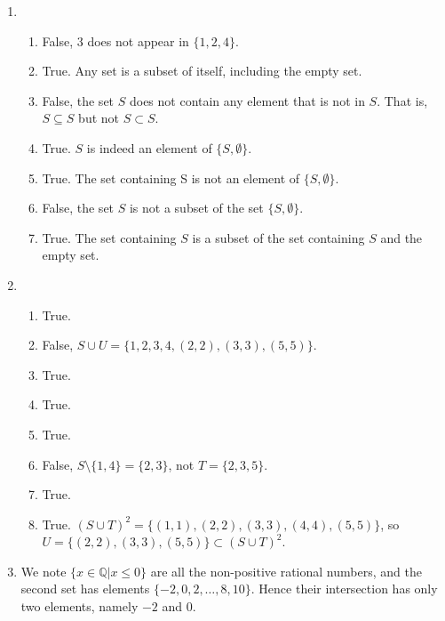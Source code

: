 \begin{enumerate}
    \item \begin{enumerate}[label=(\alph*)]
        \item False, 3 does not appear in $\{1, 2, 4\}$.
        \item True. Any set is a subset of itself, including the empty set.
        \item False, the set $S$ does not contain any element that is not in $S$. That is, $S \subseteq S$ but not $S \subset S$.
        \item True. $S$ is indeed an element of $\{S, \emptyset\}$.
        \item True. The set containing S is not an element of $\{S, \emptyset\}$.
        \item False, the set $S$ is not a subset of the set $\{S, \emptyset\}$.
        \item True. The set containing $S$ is a subset of the set containing $S$ and the empty set.
    \end{enumerate}
    
    \item \begin{enumerate}[label=(\alph*)]
        \item True.
        \item False, $S \cup U = \{1, 2, 3, 4, (2, 2), (3, 3), (5, 5)\}$.
        \item True.
        \item True.
        \item True.
        \item False, $S \setminus \{1, 4\} = \{2, 3\}$, not $T = \{2, 3, 5\}$.
        \item True.
        \item True. $(S \cup T)^2 = \{(1,1), (2,2), (3,3), (4,4), (5,5)\}$, so $U = \{(2,2), (3,3), (5,5)\} \subset (S \cup T)^2$.
    \end{enumerate}
    \item We note $\{x \in \mathbb{Q} \vert x \leq 0\}$ are all the non-positive rational numbers, and the second set has elements $\{-2, 0, 2, \dots, 8, 10\}$. Hence their intersection has only two elements, namely $-2$ and $0$.
\end{enumerate}

